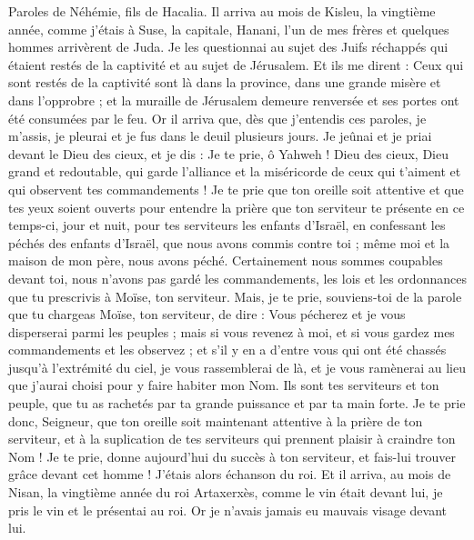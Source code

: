 \begin{multicols}{2}
\VerseOne{}Paroles de Néhémie, fils de Hacalia. Il arriva au mois de Kisleu, la vingtième année, comme j'étais à Suse, la capitale,
Hanani, l'un de mes frères et quelques hommes arrivèrent de Juda. Je les questionnai au sujet des Juifs réchappés qui étaient restés de la captivité et au sujet de Jérusalem.
Et ils me dirent : Ceux qui sont restés de la captivité sont là dans la province, dans une grande misère et dans l'opprobre ; et la muraille de Jérusalem demeure renversée et ses portes ont été consumées par le feu.
Or il arriva que, dès que j'entendis ces paroles, je m'assis, je pleurai et je fus dans le deuil plusieurs jours. Je jeûnai et je priai devant le Dieu des cieux,
 et je dis : Je te prie, ô Yahweh ! Dieu des cieux, Dieu grand et redoutable, qui garde l'alliance et la miséricorde de ceux qui t'aiment et qui observent tes commandements !
Je te prie que ton oreille soit attentive et que tes yeux soient ouverts pour entendre la prière que ton serviteur te présente en ce temps-ci, jour et nuit, pour tes serviteurs les enfants d'Israël, en confessant les péchés des enfants d'Israël, que nous avons commis contre toi ; même moi et la maison de mon père, nous avons péché.
Certainement nous sommes coupables devant toi, nous n'avons pas gardé les commandements, les lois et les ordonnances que tu prescrivis à Moïse, ton serviteur.
Mais, je te prie, souviens-toi de la parole que tu chargeas Moïse, ton serviteur, de dire : Vous pécherez et je vous disperserai parmi les peuples ;
mais si vous revenez à moi, et si vous gardez mes commandements et les observez ; et s'il y en a d'entre vous qui ont été chassés jusqu'à l'extrémité du ciel, je vous rassemblerai de là, et je vous ramènerai au lieu que j'aurai choisi pour y faire habiter mon Nom.
Ils sont tes serviteurs et ton peuple, que tu as rachetés par ta grande puissance et par ta main forte.
Je te prie donc, Seigneur, que ton oreille soit maintenant attentive à la prière de ton serviteur, et à la suplication de tes serviteurs qui prennent plaisir à craindre ton Nom ! Je te prie, donne aujourd'hui du succès à ton serviteur, et fais-lui trouver grâce devant cet homme ! J'étais alors échanson du roi.
\VerseOne{}Et il arriva, au mois de Nisan, la vingtième année du roi Artaxerxès, comme le vin était devant lui, je pris le vin et le présentai au roi. Or je n'avais jamais eu mauvais visage devant lui.

\end{multicols}
